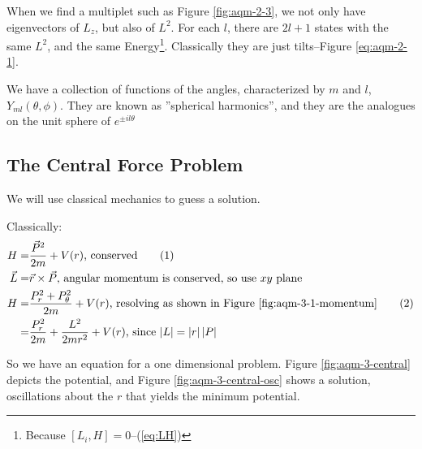 \documentclass[]{article}
\newcommand\numberthis{\addtocounter{equation}{1}\tag{\theequation}}
\begin{document}
When we find a multiplet such as Figure \ref{fig:aqm-2-3}, we not only have eigenvectors of $L_z$, but also of $L^2$. For each $l $, there are $2l+1$ states with the same $L^2$, and the same Energy\footnote{Because $[L_i,H]=0$--(\ref{eq:LH})}. Classically they are just tilts--Figure \ref{eq:aqm-2-1}.

We have a collection of functions of the angles, characterized by $m$ and $l$, $Y_{ml}(\theta,\phi)$. They are known as ''spherical harmonics'', and they are the analogues on the unit sphere of $e^{\pm i l \theta}$

\subsection{The Central Force Problem}

We will use classical mechanics to guess a solution.


Classically:
\begin{align*}
	H =& \frac{\vec{P}^2}{2m} + V(r) \text{, conserved} \numberthis \label{eq:classical:Hamiltonian}\\
	\vec{L} =& \vec{r}\times \vec{P}  \text{, angular momentum is conserved, so use $xy$ plane}\\
	H =& \frac{P_r^2+P_{\theta}^2}{2m} +V(r) \text{, resolving as shown in Figure \ref{fig:aqm-3-1-momentum}} \numberthis \label{eq:resolve}\\
	=& \frac{P_r^2}{2m} + \frac{L^2}{2m r^2} + V(r) \text{, since $\left|L\right| = \left|r\right| \left|P\right|$}
\end{align*}

So we have an equation for a one dimensional problem. Figure \ref{fig:aqm-3-central} depicts the potential, and Figure \ref{fig:aqm-3-central-osc} shows a solution, oscillations about the $r$ that yields the minimum potential. 
\end{document}
